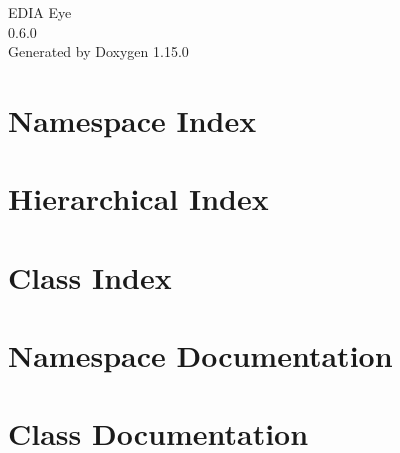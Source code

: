 \documentclass[twoside]{book}
\newcommand{\+}{\discretionary{\mbox{\scriptsize$\hookleftarrow$}}{}{}}
\newcommand{\clearemptydoublepage}{%
    \newpage{\pagestyle{empty}\cleardoublepage}%
  }
\begin{document}
  \raggedbottom
    \hypersetup{pageanchor=false,
                bookmarksnumbered=true,
                pdfencoding=unicode
               }
  \begin{titlepage}
  \vspace*{7cm}
  \begin{center}%
  {\Large EDIA Eye}\\
  [1ex]\large 0.\+6.\+0 \\
  \vspace*{1cm}
  {\large Generated by Doxygen 1.15.0}\\
  \end{center}
  \end{titlepage}
  \clearemptydoublepage
  \tableofcontents
  \clearemptydoublepage
  \hypersetup{pageanchor=true}
\chapter{Namespace Index}

\chapter{Hierarchical Index}

\chapter{Class Index}

\chapter{Namespace Documentation}


\chapter{Class Documentation}













  \backmatter
  \newpage
  \clearemptydoublepage
  \printindex
\end{document}

